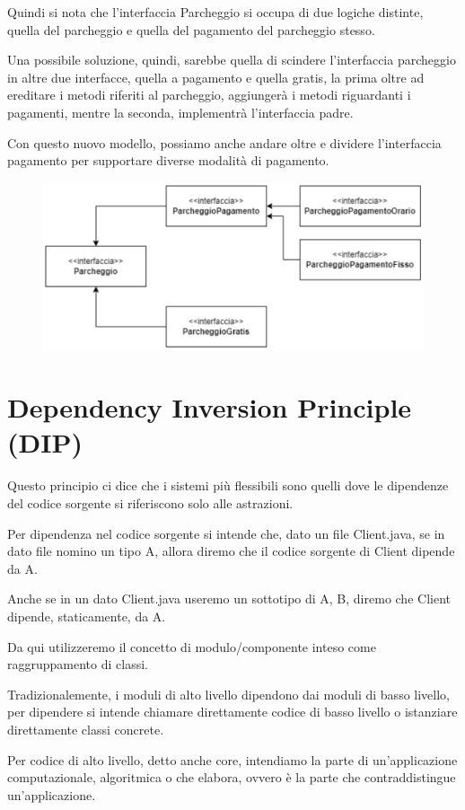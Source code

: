 Quindi si nota che l'interfaccia Parcheggio si occupa di due logiche distinte, quella del parcheggio e quella del pagamento del parcheggio stesso.

Una possibile soluzione, quindi, sarebbe quella di scindere l'interfaccia parcheggio in altre due interfacce, quella a pagamento e quella gratis, la prima oltre 
ad ereditare i metodi riferiti al parcheggio, aggiungerà i metodi riguardanti i pagamenti, mentre la seconda, implementrà l'interfaccia padre.

Con questo nuovo modello, possiamo anche andare oltre e dividere l'interfaccia pagamento per supportare diverse modalità di pagamento.

\begin{figure}[H]
  \centering
  \includegraphics[width=0.5\linewidth]{../../immagini/principio_SOLID/refactoring_interfaccia.png}
\end{figure}

\section{Dependency Inversion Principle (DIP)}

Questo principio ci dice che i sistemi più flessibili sono quelli dove le dipendenze del codice sorgente si riferiscono solo alle astrazioni.

Per dipendenza nel codice sorgente si intende che, dato un file Client.java, se in dato file nomino un tipo A, allora diremo che il codice sorgente di Client dipende 
da A.

Anche se in un dato Client.java useremo un sottotipo di A, B, diremo che Client dipende, staticamente, da A.

Da qui utilizzeremo il concetto di modulo/componente inteso come raggruppamento di classi.

Tradizionalemente, i moduli di alto livello dipendono dai moduli di basso livello, per dipendere si intende chiamare direttamente codice di basso livello o istanziare
direttamente classi concrete.

Per codice di alto livello, detto anche core, intendiamo la parte di un'applicazione computazionale, algoritmica o che elabora, ovvero è la parte che contraddistingue 
un'applicazione.

